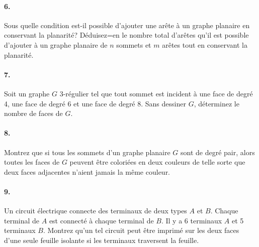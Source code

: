 \paragraph{6. }Sous quelle condition est-il possible d'ajouter une arête à un graphe planaire en conservant la planarité? Déduisez=en le nombre total d'arêtes qu'il est possible d'ajouter à un graphe planaire de $n$ sommets et $m$ arêtes tout en conservant la planarité.

\paragraph{7. }Soit un graphe $G$ 3-régulier tel que tout sommet est incident à une face de degré 4, une face de degré 6 et une face de degré 8. Sans dessiner $G$, déterminez le nombre de faces de $G$.

\paragraph{8. }Montrez que si tous les sommets d'un graphe planaire $G$ sont de degré pair, alors toutes les faces de $G$ peuvent être coloriées en deux couleurs de telle sorte que deux faces adjacentes n'aient jamais la même couleur. 

\paragraph{9. }Un circuit électrique connecte des terminaux de deux types $A$ et $B$. Chaque terminal de $A$ est connecté à chaque terminal de $B$. Il y a 6 terminaux $A$ et 5 terminaux $B$. Montrez qu'un tel circuit peut être imprimé sur les deux faces d'une seule feuille isolante si les terminaux traversent la feuille.